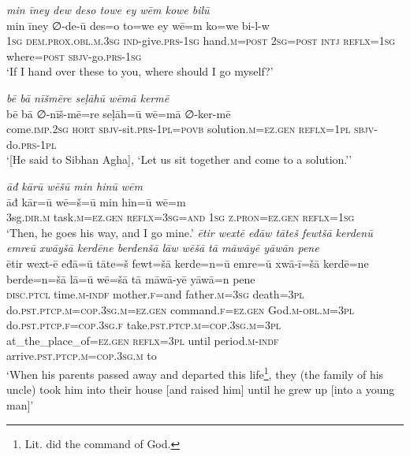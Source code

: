 \ea \label{DP.23}
\textit{min īney dew deso towe ey wēm kowe bilū} \\ 
\gll min īney ∅-de-ū des=o to=we ey wē=m ko=we bi-l-w \\ 
 \textsc{1sg} \textsc{dem.prox}\textsc{.obl}\textsc{.m}\textsc{.3sg} \textsc{ind-}give\textsc{.prs}\textsc{-1sg} hand\textsc{.m}\textsc{=\textsc{post}} \textsc{2sg}\textsc{=\textsc{post}} \textsc{intj} \textsc{reflx}\textsc{=1sg} where\textsc{=\textsc{post}} \textsc{sbjv-}go\textsc{.prs}\textsc{-1sg} \\ 
\glt `If I hand over these to you, where should I go myself?'
\z 
 
\ea \label{DP.39}
\textit{bē bā nīšmēre seḷāhū wēmā kermē} \\ 
\gll bē bā ∅-nīš-mē=re seḷāh=ū wē=mā ∅-ker-mē \\ 
 come\textsc{.imp}\textsc{.\textsc{2sg}} \textsc{hort} \textsc{sbjv-}sit\textsc{.prs}\textsc{-1pl}\textsc{=\textsc{povb}} solution\textsc{.m}\textsc{=ez}\textsc{.gen} \textsc{reflx}\textsc{=1pl} \textsc{sbjv-}do\textsc{.prs}\textsc{-1pl} \\ 
\glt `[He said to Sibhan Agha], ‘Let us sit together and come to a solution.’'
\z 
 
\ea \label{DP.45}
\textit{āđ kārū wēšū min hinū wēm} \\ 
\gll āđ kār=ū wē=š=ū min hin=ū wē=m \\ 
 3sg\textsc{.dir}\textsc{.m} task\textsc{.m}\textsc{=ez}\textsc{.gen} \textsc{reflx}\textsc{=3sg}\textsc{=and} \textsc{1sg} \textsc{z.pron}\textsc{=ez}\textsc{.gen} \textsc{reflx}\textsc{=1sg} \\ 
\glt `Then, he goes his way, and I go mine.'
\z 
\ea \label{ZP.8}
\textit{ētir wextē eđāw tāteš fewtšā kerdenū emreū xwāyšā kerdēne berdenšā lāw wēšā tā māwāyē yāwān pene} \\ 
\gll ētir wext-ē eđā=ū tāte=š fewt=šā kerde=n=ū emre=ū xwā-ī=šā kerdē=ne berde=n=šā lā=ū wē=šā tā māwā-yē yāwā=n pene \\ 
 \textsc{disc.ptcl} time\textsc{.m}\textsc{-indf} mother\textsc{.f}=and father\textsc{.m}\textsc{=3sg} death\textsc{=3pl} do\textsc{.pst}\textsc{.ptcp}\textsc{.m}\textsc{=cop}\textsc{.3sg}\textsc{.m}\textsc{\textsc{=ez.gen}} command\textsc{.f}\textsc{\textsc{=ez.gen}} God\textsc{.m}\textsc{-obl}\textsc{.m}\textsc{=3pl} do\textsc{.pst}\textsc{.ptcp}\textsc{.f}\textsc{=cop}\textsc{.3sg}\textsc{.f} take\textsc{.pst}\textsc{.ptcp}\textsc{.m}\textsc{=cop}\textsc{.3sg}\textsc{.m}\textsc{=3pl} at\_the\_place\_of\textsc{\textsc{=ez.gen}} \textsc{reflx}\textsc{=3pl} until period\textsc{.m}\textsc{-indf} arrive\textsc{.pst}\textsc{.ptcp}\textsc{.m}\textsc{=cop}\textsc{.3sg}\textsc{.m} to \\ 
\glt `When his parents passed away and departed this life\footnote{Lit. did the command of God.}, they (the family of his uncle) took him into their house [and raised him] until he grew up [into a young man]'
\z 
 
